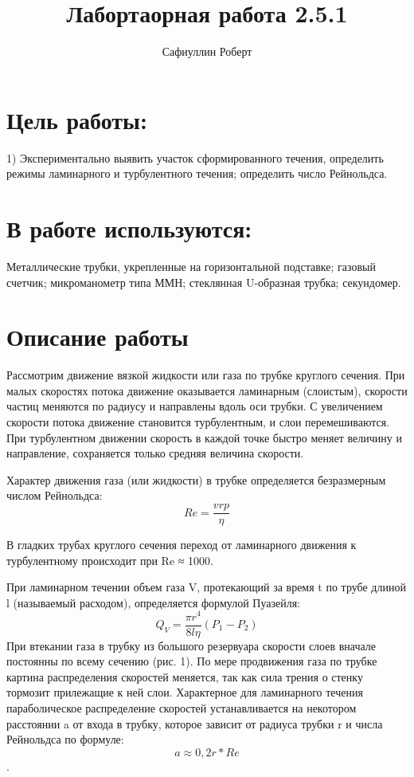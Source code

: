 \documentclass[a4paper,12pt]{article} %
\author{Сафиуллин Роберт	}
\title{Лабортаорная работа 2.5.1}
\begin{document}

\maketitle


\newpage
\section{Цель работы:}
1)  Экспериментально выявить участок сформированного течения, определить режимы ламинарного и турбулентного течения; определить число Рейнольдса.\\
\section{В работе используются:}
Металлические трубки, укрепленные на горизонтальной подставке; газовый счетчик; микроманометр типа ММН; стеклянная U-образная трубка; секундомер.
 \section{Описание работы}
 Рассмотрим движение вязкой жидкости или газа по трубке круглого сечения. При малых скоростях потока движение оказывается ламинарным (слоистым), скорости частиц меняются по радиусу и направлены вдоль оси трубки. С увеличением скорости потока движение
становится турбулентным, и слои перемешиваются. При турбулентном движении скорость в каждой точке быстро меняет величину и направление, сохраняется только средняя величина скорости.

Характер движения газа (или жидкости) в трубке определяется безразмерным числом Рейнольдса: $$Re=\frac{vrp}{\eta}$$

В гладких трубах круглого сечения переход от ламинарного движения к турбулентному происходит при Re ≈ 1000.

При ламинарном течении объем газа V, протекающий за время t по трубе длиной l (называемый расходом), определяется формулой Пуазейля: $$Q_V=\frac{\pi r^4}{8l\eta}(P_1-P_2)$$
При	втекании	газа	в	
трубку	из большого резервуара скорости слоев вначале постоянны по всему сечению (рис. 1). 
\indent
\indent По мере продвижения  газа по	трубке	
картина распределения скоростей меняется, так как сила трения о стенку тормозит прилежащие к ней слои. Характерное для ламинарного	
течения параболическое распределение скоростей устанавливается на	
некотором расстоянии a от входа в трубку, которое зависит от радиуса трубки r и числа Рейнольдса по формуле: $$a\approx0,2r*Re$$.\\
\newpage
\end{document}
